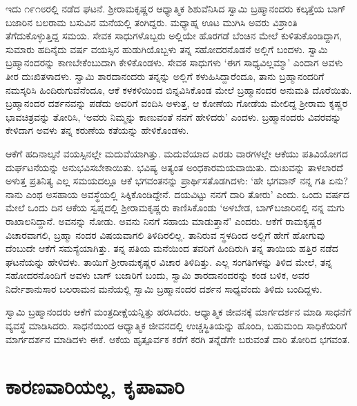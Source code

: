ಇದು ೧೯೧೮ರಲ್ಲಿ ನಡೆದ ಘಟನೆ. ಶ‍್ರೀರಾಮಕೃಷ್ಣರ ಆಧ್ಯಾತ್ಮಿಕ ಶಿಶುವೆನಿಸಿದ ಸ್ವಾಮಿ ಬ್ರಹ್ಮಾನಂದರು ಕಲ್ಕತ್ತೆಯ ಬಾಗ್​ಬಜಾರಿನ ಬಲರಾಮ ಬಸುವಿನ ಮನೆಯಲ್ಲಿ ತಂಗಿದ್ದರು. ಮಧ್ಯಾಹ್ನ ಊಟ ಮುಗಿಸಿ ಅವರು ವಿಶ್ರಾಂತಿ ತೆಗೆದುಕೊಳ್ಳುತ್ತಿದ್ದ ಸಮಯ. ಸೇವಕ ಸಾಧುಗಳೊಬ್ಬರು ಅಲ್ಲಿಯೇ ಹೊರಗಡೆ ಬೆಂಚಿನ ಮೇಲೆ ಕುಳಿತುಕೊಂಡಿದ್ದಾಗ, ಸುಮಾರು ಹದಿನೈದು ವರ್ಷ ವಯಸ್ಸಿನ ಹುಡುಗಿಯೊಬ್ಬಳು ತನ್ನ ಸಹೋದರನೊಡನೆ ಅಲ್ಲಿಗೆ ಬಂದಳು. ಸ್ವಾಮಿ ಬ್ರಹ್ಮಾನಂದರನ್ನು ಕಾಣಬೇಕೆಂಬುದಾಗಿ ಕೇಳಿಕೊಂಡಳು. ಸೇವಕ ಸಾಧುಗಳು ‘ಈಗ ಸಾಧ್ಯವಿಲ್ಲಮ್ಮಾ’ ಎಂದಾಗ ಅವಳು ತೀರ ದುಃಖಿತಳಾದಳು. ಸ್ವಾಮಿ ಶಾರದಾನಂದರು ತನ್ನನ್ನು ಅಲ್ಲಿಗೆ ಕಳುಹಿಸಿದ್ದಾರೆಂದೂ, ತಾನು ಬ್ರಹ್ಮಾನಂದರಿಗೆ ನಮಸ್ಕರಿಸಿ ಹಿಂದಿರುಗುವೆನೆಂದೂ, ಆಕೆ ಕಳಕಳಿಯಿಂದ ಬಿನ್ನವಿಸಿಕೊಂಡ ಮೇಲೆ ಬ್ರಹ್ಮಾನಂದರ ಅನುಮತಿ ದೊರೆಯಿತು. ಬ್ರಹ್ಮಾನಂದರ ದರ್ಶನವನ್ನು ಪಡೆದು ಅವರಿಗೆ ವಂದಿಸಿ ಅಳುತ್ತ, ಆ ಕೋಣೆಯ ಗೋಡೆಯ ಮೇಲಿದ್ದ ಶ‍್ರೀರಾಮ ಕೃಷ್ಣರ ಭಾವಚಿತ್ರವನ್ನು ತೋರಿಸಿ, ‘ಅವರು ನಿಮ್ಮನ್ನು ಕಾಣುವಂತೆ ನನಗೆ ಹೇಳಿದರು’ ಎಂದಳು. ಬ್ರಹ್ಮಾನಂದರು ವಿವರವನ್ನು ಕೇಳಿದಾಗ ಅವಳು ತನ್ನ ಕರುಣೆಯ ಕತೆಯನ್ನು ಹೇಳಿಕೊಂಡಳು.

ಆಕೆಗೆ ಹದಿನಾಲ್ಕನೆ ವಯಸ್ಸಿನಲ್ಲೇ ಮದುವೆಯಾಗಿತ್ತು. ಮದುವೆಯಾದ ಎರಡು ವಾರಗಳಲ್ಲೇ ಆಕೆಯು ಪತಿವಿಯೋಗದ ದುರ್ಘಟನೆಯನ್ನು ಅನುಭವಿಸಬೇಕಾಯಿತು. ಭವಿಷ್ಯ ಅತ್ಯಂತ ಅಂಧಕಾರಮಯವಾಯಿತು. ದುಃಖವನ್ನು ತಾಳಲಾರದೆ ಅಳುತ್ತ ಪ್ರತಿನಿತ್ಯ ಎಲ್ಲ ಸಮಯದಲ್ಲೂ ಆಕೆ ಭಗವಂತನನ್ನು ಪ್ರಾರ್ಥಿಸತೊಡಗಿದಳು: ‘ಹೇ ಭಗವಾನ್ ನನ್ನ ಗತಿ ಏನು? ನಾನು ಎಂಥ ಅಸಹಾಯ ಅವಸ್ಥೆಯಲ್ಲಿ ಸಿಕ್ಕಿಕೊಂಡಿದ್ದೇನೆ. ದಯವಿಟ್ಟು ನನಗೆ ದಾರಿ ತೋರು’ ಎಂದು. ಒಂದು ವರ್ಷದ ಮೇಲೆ ಒಂದು ದಿನ ಆಕೆಯ ಸ್ವಪ್ನದಲ್ಲಿ ಶ‍್ರೀರಾಮಕೃಷ್ಣರು ಕಾಣಿಸಿಕೊಂಡು ‘ಅಳಬೇಡ, ಬಾಗ್​ಬಜಾರಿನಲ್ಲಿ ನನ್ನ ಮಗು ರಾಖಾಲನಿದ್ದಾನೆ. ಅವನನ್ನು ನೋಡು. ಅವನು ನಿನಗೆ ಸಹಾಯ ಮಾಡುತ್ತಾನೆ’ ಎಂದರು. ಆಕೆಗೆ ರಾಮಕೃಷ್ಣರ ವಿಚಾರವಾಗಲಿ, ಬ್ರಹ್ಮಾ ನಂದರ ವಿಷಯವಾಗಲಿ ತಿಳಿದಿರಲಿಲ್ಲ. ತಾನಿರುವ ಸ್ಥಳದಿಂದ ಅಲ್ಲಿಗೆ ಹೇಗೆ ಹೋಗುವು ದೆಂಬುದೇ ಆಕೆಗೆ ಸಮಸ್ಯೆಯಾಗಿತ್ತು. ತನ್ನ ಪತಿಯ ಮನೆಯಿಂದ ತವರಿಗೆ ಹಿಂದಿರುಗಿ ತನ್ನ ತಾಯಿಯ ಹತ್ತಿರ ನಡೆದ ಘಟನೆಯನ್ನು ಹೇಳಿದಳು. ತಾಯಿಗೆ ಶ‍್ರೀರಾಮಕೃಷ್ಣರ ವಿಚಾರ ತಿಳಿದಿತ್ತು. ಎಲ್ಲ ಸಂಗತಿಗಳನ್ನು ತಿಳಿದ ಮೇಲೆ, ತನ್ನ ಸಹೋದರನೊಂದಿಗೆ ಅವಳು ಬಾಗ್ ಬಜಾರಿಗೆ ಬಂದು, ಸ್ವಾಮಿ ಶಾರದಾನಂದರನ್ನು ಕಂಡ ಬಳಿಕ, ಅವರ ನಿರ್ದೇಶಾನುಸಾರ ಬಲರಾಮನ ಮನೆಯಲ್ಲಿ ಸ್ವಾಮಿ ಬ್ರಹ್ಮಾನಂದರ ದರ್ಶನ ಸಾಧ್ಯವೆಂದು ತಿಳಿದು ಬಂದಿದ್ದಳು.

ಸ್ವಾಮಿ ಬ್ರಹ್ಮಾನಂದರು ಆಕೆಗೆ ಮಂತ್ರದೀಕ್ಷೆಯನ್ನಿತ್ತು ಹರಸಿದರು. ಆಧ್ಯಾತ್ಮಿಕ ಜೀವನಕ್ಕೆ ಮಾರ್ಗದರ್ಶನ ಮಾಡಿ ಸಾಧನೆಗೆ ವ್ಯವಸ್ಥೆ ಮಾಡಿಸಿದರು. ಸಾಧನೆಯಿಂದ ಆಧ್ಯಾತ್ಮಿಕ ಜೀವನದಲ್ಲಿ ಉಚ್ಚಸ್ಥಿತಿಯನ್ನು ಹೊಂದಿ, ಬಹುಮಂದಿ ಸಾಧಿಕೆಯರಿಗೆ ಮಾರ್ಗದರ್ಶನ ಮಾಡಿದಳು ಈಕೆ. ಆಕೆಯ ಹೃತ್ಪೂರ್ವಕ ಕರೆಗೆ ಕರಗಿ ತನ್ನೆಡೆಗೇ ಬರುವಂತೆ ದಾರಿ ತೋರಿದ ಭಗವಂತ.


\section{ಕಾರಣವಾರಿಯಲ್ಲ, ಕೃಪಾವಾರಿ}

